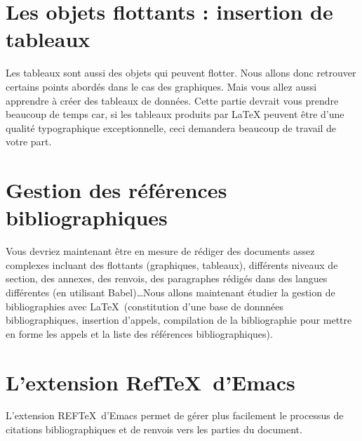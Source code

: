 


\chapter{Les objets flottants : insertion de tableaux}
\label{cha:tableaux}
\begin{center}
  \begin{minipage}[r]{0.5\linewidth}
    Les tableaux sont aussi des objets qui peuvent flotter. Nous
    allons donc retrouver certains points abordés dans le cas des
    graphiques. Mais vous allez aussi apprendre à créer des tableaux
    de données. Cette partie devrait vous prendre beaucoup de temps
    car, si les tableaux produits par LaTeX peuvent être d'une qualité
    typographique exceptionnelle, ceci demandera beaucoup de travail
    de votre part.
  \end{minipage}
\end{center}






\chapter{Gestion des références bibliographiques}
\label{cha:bibtex}
\begin{center}
  \begin{minipage}[r]{0.5\linewidth}
    Vous devriez maintenant être en mesure de rédiger des documents
    assez complexes incluant des flottants (graphiques, tableaux),
    différents niveaux de section, des annexes, des renvois, des
    paragraphes rédigés dans des langues différentes (en utilisant
    Babel)\ldots Nous allons maintenant étudier la gestion de
    bibliographies avec \LaTeX\ (constitution d'une base de donnnées
    bibliographiques, insertion d'appels, compilation de la
    bibliographie pour mettre en forme les appels et la liste des
    références bibliographiques).
  \end{minipage}
\end{center}




\chapter{L'extension Ref\TeX\ d'Emacs}
\label{cha:reftex}
\begin{center}
  \begin{minipage}[r]{0.5\linewidth}
    L'extension REF\TeX\ d'Emacs permet de gérer plus facilement le
    processus de citations bibliographiques et de renvois vers les
    parties du document.
  \end{minipage}
\end{center}

